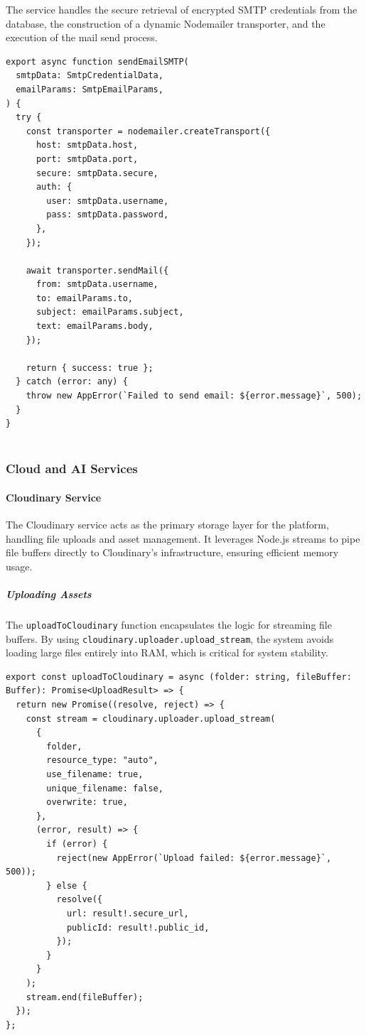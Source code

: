 The service handles the secure retrieval of encrypted SMTP credentials from the database, the construction of a dynamic Nodemailer transporter, and the execution of the mail send process.

\begin{lstlisting}[caption={SMTP execution flow (\texttt{smtp.service.ts})}]
export async function sendEmailSMTP(
  smtpData: SmtpCredentialData,
  emailParams: SmtpEmailParams,
) {
  try {
    const transporter = nodemailer.createTransport({
      host: smtpData.host,
      port: smtpData.port,
      secure: smtpData.secure,
      auth: {
        user: smtpData.username,
        pass: smtpData.password,
      },
    });

    await transporter.sendMail({
      from: smtpData.username,
      to: emailParams.to,
      subject: emailParams.subject,
      text: emailParams.body,
    });

    return { success: true };
  } catch (error: any) {
    throw new AppError(`Failed to send email: ${error.message}`, 500);
  }
}


\end{lstlisting}
\subsubsection{Cloud and AI Services}

\paragraph{Cloudinary Service}
The Cloudinary service acts as the primary storage layer for the platform, handling file uploads and asset management. It leverages Node.js streams to pipe file buffers directly to Cloudinary's infrastructure, ensuring efficient memory usage.

\subparagraph{Uploading Assets}
The \texttt{uploadToCloudinary} function encapsulates the logic for streaming file buffers. By using \texttt{cloudinary.uploader.upload\_stream}, the system avoids loading large files entirely into RAM, which is critical for system stability.

\begin{lstlisting}[caption={Cloudinary upload logic (\texttt{cloudinary.service.ts})}]
export const uploadToCloudinary = async (folder: string, fileBuffer: Buffer): Promise<UploadResult> => {
  return new Promise((resolve, reject) => {
    const stream = cloudinary.uploader.upload_stream(
      {
        folder,
        resource_type: "auto",
        use_filename: true,
        unique_filename: false,
        overwrite: true,
      },
      (error, result) => {
        if (error) {
          reject(new AppError(`Upload failed: ${error.message}`, 500));
        } else {
          resolve({
            url: result!.secure_url,
            publicId: result!.public_id,
          });
        }
      }
    );
    stream.end(fileBuffer);
  });
};
\end{lstlisting}

